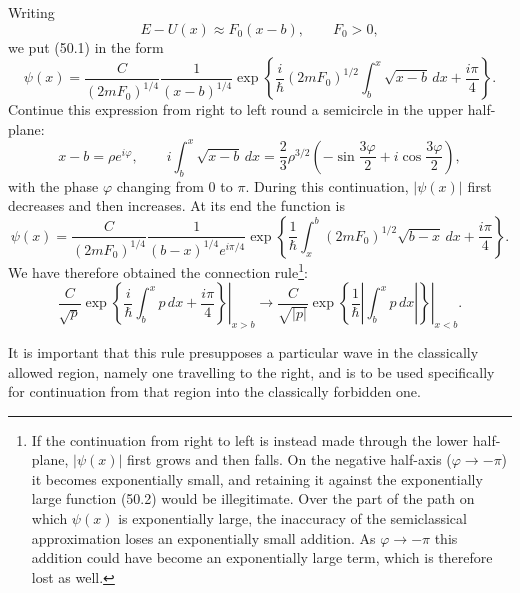 Writing
\[
 E-U(x)\approx F_0(x-b),\qquad F_0>0,
\]
we put (50.1) in the form
\[
 \psi(x)=\frac{C}{(2mF_0)^{1/4}}\frac1{(x-b)^{1/4}}
 \exp\left\{\frac{i}{\hbar}(2mF_0)^{1/2}
 \int_b^x\sqrt{x-b}\,dx+\frac{i\pi}{4}\right\}.
\]
Continue this expression from right to left round a semicircle in the upper
half-plane:
\[
 x-b=\rho e^{i\varphi},\qquad
 i\int_b^x\sqrt{x-b}\,dx=\frac23\rho^{3/2}
 \left(-\sin\frac{3\varphi}{2}+i\cos\frac{3\varphi}{2}\right),
\]
with the phase $\varphi$ changing from 0 to $\pi$. During this continuation,
$|\psi(x)|$ first decreases and then increases. At its end the function is
\[
 \psi(x)=\frac{C}{(2mF_0)^{1/4}}\frac1{(b-x)^{1/4}e^{i\pi/4}}
 \exp\left\{\frac1\hbar\int_x^b(2mF_0)^{1/2}\sqrt{b-x}\,dx+\frac{i\pi}{4}\right\}.
\]
We have therefore obtained the connection rule\footnote{If the continuation
from right to left is instead made through the lower half-plane, $|\psi(x)|$
first grows and then falls. On the negative half-axis ($\varphi\to-\pi$) it
becomes exponentially small, and retaining it against the exponentially large
function (50.2) would be illegitimate. Over the part of the path on which
$\psi(x)$ is exponentially large, the inaccuracy of the semiclassical
approximation loses an exponentially small addition. As $\varphi\to-\pi$ this
addition could have become an exponentially large term, which is therefore
lost as well.}:
\begin{equation}
 \left.\frac{C}{\sqrt p}\exp\left\{\frac{i}{\hbar}\int_b^x p\,dx+
 \frac{i\pi}{4}\right\}\right|_{x>b}
 \longrightarrow
 \left.\frac{C}{\sqrt{|p|}}\exp\left\{\frac1\hbar
 \left|\int_b^x p\,dx\right|\right\}\right|_{x<b}.
 \tag{50.2}
\end{equation}

It is important that this rule presupposes a particular wave in the
classically allowed region, namely one travelling to the right, and is to be
used specifically for continuation from that region into the classically
forbidden one.

